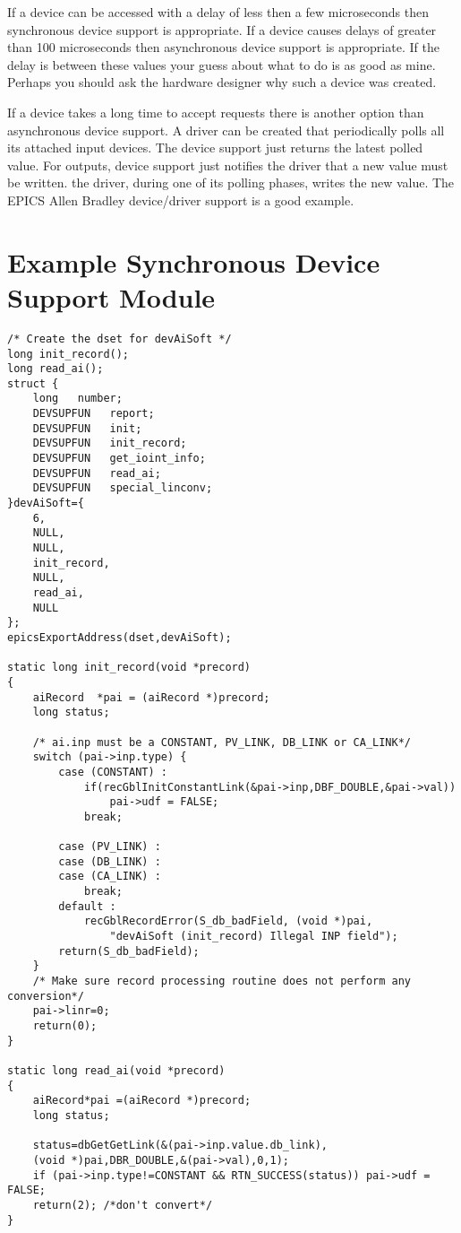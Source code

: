 If a device can be accessed with a delay of less then a few microseconds then synchronous device support is appropriate. 
If a device causes delays of greater than 100 microseconds then asynchronous device support is appropriate. If the delay is 
between these values your guess about what to do is as good as mine. Perhaps you should ask the hardware designer why 
such a device was created.

If a device takes a long time to accept requests there is another option than asynchronous device support. A driver can be 
created that periodically polls all its attached input devices. The device support just returns the latest polled value. For 
outputs, device support just notifies the driver that a new value must be written. the driver, during one of its polling 
phases, writes the new value. The EPICS Allen Bradley device/driver support is a good example.

\section{Example Synchronous Device Support Module}

\begin{verbatim}
/* Create the dset for devAiSoft */
long init_record();
long read_ai();
struct {
    long   number;
    DEVSUPFUN   report;
    DEVSUPFUN   init;
    DEVSUPFUN   init_record;
    DEVSUPFUN   get_ioint_info;
    DEVSUPFUN   read_ai;
    DEVSUPFUN   special_linconv;
}devAiSoft={
    6,
    NULL,
    NULL,
    init_record,
    NULL,
    read_ai,
    NULL
};
epicsExportAddress(dset,devAiSoft);

static long init_record(void *precord)
{
    aiRecord  *pai = (aiRecord *)precord;
    long status;

    /* ai.inp must be a CONSTANT, PV_LINK, DB_LINK or CA_LINK*/
    switch (pai->inp.type) {
        case (CONSTANT) :
            if(recGblInitConstantLink(&pai->inp,DBF_DOUBLE,&pai->val))
                pai->udf = FALSE;
            break;

        case (PV_LINK) :
        case (DB_LINK) :
        case (CA_LINK) :
            break;
        default :
            recGblRecordError(S_db_badField, (void *)pai,
                "devAiSoft (init_record) Illegal INP field");
        return(S_db_badField);
    }
    /* Make sure record processing routine does not perform any conversion*/
    pai->linr=0;
    return(0);
}

static long read_ai(void *precord)
{
    aiRecord*pai =(aiRecord *)precord;
    long status;

    status=dbGetGetLink(&(pai->inp.value.db_link),
    (void *)pai,DBR_DOUBLE,&(pai->val),0,1);
    if (pai->inp.type!=CONSTANT && RTN_SUCCESS(status)) pai->udf = FALSE;
    return(2); /*don't convert*/
}
\end{verbatim}

